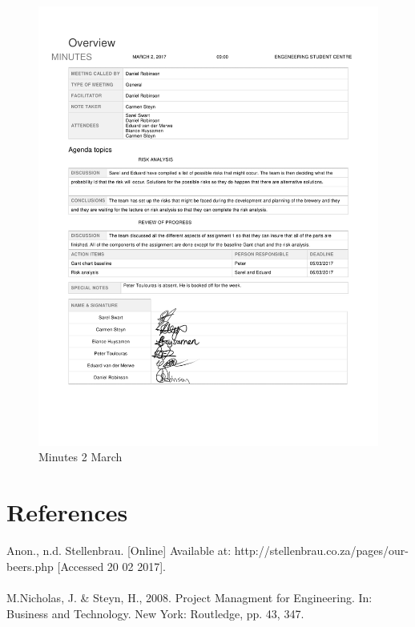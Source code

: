 \begin{appendices}
\begin{figure}[H]
\centering
\includegraphics[scale=0.25]{Meeting_minutes_02_March.png}
\caption{Minutes 2 March}
\end{figure}

\end{appendices}

\newpage
\section*{References}

Anon., n.d. Stellenbrau. [Online] 
Available at: http://stellenbrau.co.za/pages/our-beers.php
[Accessed 20 02 2017].\\\\

\noindent
M.Nicholas, J. \& Steyn, H., 2008. Project Managment for Engineering. In: Business and Technology. New York: Routledge, pp. 43, 347.




% 





